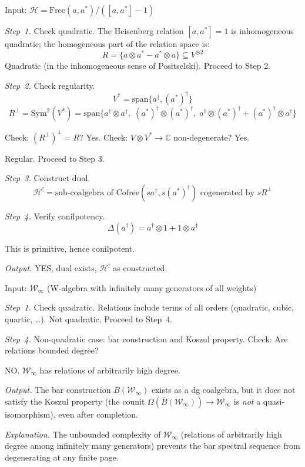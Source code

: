 \begin{example}\label{ex:algorithm-heisenberg}
Input: $\mathcal{H} = \text{Free}(a, a^*) / ([a, a^*] - 1)$

\emph{Step~1.} Check quadratic. The Heisenberg relation $[a, a^*] = 1$ is inhomogeneous quadratic; the homogeneous part of the relation space is:
\[R = \{a \otimes a^* - a^* \otimes a\} \subseteq V^{\otimes 2}\]
Quadratic (in the inhomogeneous sense of Positselski). Proceed to Step 2.

\emph{Step~2.} Check regularity.
\[V^* = \text{span}\{a^{\dagger}, (a^*)^{\dagger}\}\]
\[R^\perp = \mathrm{Sym}^2(V^*) = \text{span}\{a^{\dagger} \otimes a^{\dagger},\; (a^*)^{\dagger} \otimes (a^*)^{\dagger},\; a^{\dagger} \otimes (a^*)^{\dagger} + (a^*)^{\dagger} \otimes a^{\dagger}\}\]

Check: $(R^\perp)^\perp = R$? Yes.
Check: $V \otimes V^* \to \mathbb{C}$ non-degenerate? Yes.

Regular. Proceed to Step 3.

\emph{Step~3.} Construct dual.
\[\mathcal{H}^! = \text{sub-coalgebra of } \text{Cofree}(sa^{\dagger}, s(a^*)^{\dagger}) \text{ cogenerated by } sR^\perp\]

\emph{Step~4.} Verify conilpotency.
\[\Delta(a^{\dagger}) = a^{\dagger} \otimes 1 + 1 \otimes a^{\dagger}\]

This is primitive, hence conilpotent.

\emph{Output.} YES, dual exists, $\mathcal{H}^!$ as constructed.
\end{example}

\begin{example}\label{ex:algorithm-w-infinity}
Input: $\mathcal{W}_\infty$ (W-algebra with infinitely many generators of all weights)

\emph{Step~1.} Check quadratic.
Relations include terms of all orders (quadratic, cubic, quartic, \ldots).
Not quadratic. Proceed to Step~4.

\emph{Step~4.} Non-quadratic case: bar construction and Koszul property.
Check: Are relations bounded degree? 

NO. $\mathcal{W}_\infty$ has relations of arbitrarily high degree.

\emph{Output.} The bar construction $\bar{B}(\mathcal{W}_\infty)$ exists as a dg coalgebra, but it does not satisfy the Koszul property (the counit $\Omega(\bar{B}(\mathcal{W}_\infty)) \to \mathcal{W}_\infty$ is \emph{not} a quasi-isomorphism), even after completion.

\emph{Explanation.} The unbounded complexity of $\mathcal{W}_\infty$ (relations of arbitrarily high degree among infinitely many generators) prevents the bar spectral sequence from degenerating at any finite page.
\end{example}


